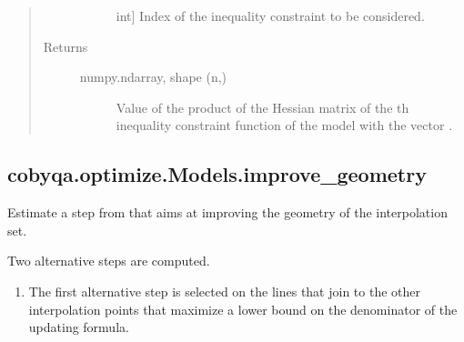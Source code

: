 \documentclass[letterpaper,10pt,english]{sphinxmanual}
\begin{document}
\begin{fulllineitems}
\begin{fulllineitems}
\begin{quote}
\begin{description}
\begin{description}
\item[{}] \leavevmode{[}int{]}
\sphinxAtStartPar
Index of the inequality constraint to be considered.

\end{description}

\item[{Returns}] \leavevmode\begin{description}
\item[{numpy.ndarray, shape (n,)}] \leavevmode
\sphinxAtStartPar
Value of the product of the Hessian matrix of the \sphinxhyphen{}th inequality
constraint function of the model with the vector .

\end{description}

\end{description}\end{quote}

\end{fulllineitems}



\subsection{cobyqa.optimize.Models.improve\_geometry}
\label{\detokenize{refs/generated/cobyqa.optimize.Models.improve_geometry:cobyqa-optimize-models-improve-geometry}}\label{\detokenize{refs/generated/cobyqa.optimize.Models.improve_geometry::doc}}

\begin{fulllineitems}
\label{\detokenize{refs/generated/cobyqa.optimize.Models.improve_geometry:cobyqa.optimize.Models.improve_geometry}}
\sphinxAtStartPar
Estimate a step from  that aims at improving the geometry of the
interpolation set.

\sphinxAtStartPar
Two alternative steps are computed.
\begin{enumerate}
%
\item {} 
\sphinxAtStartPar
The first alternative step is selected on the lines that join
 to the other interpolation points that maximize a lower
bound on the denominator of the updating formula.


\end{enumerate}
\end{fulllineitems}
\end{fulllineitems}
\end{document}
